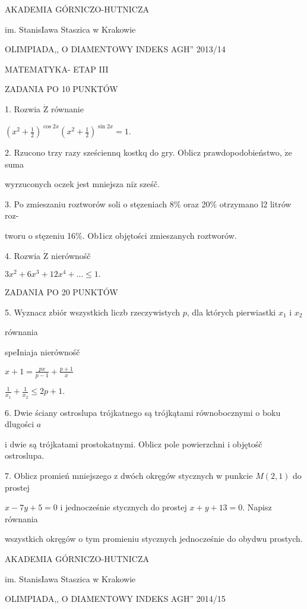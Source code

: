 \documentclass[a4paper,12pt]{article}
\begin{document}
AKADEMIA GÓRNICZO-HUTNICZA

im. StanisIawa Staszica w Krakowie

OLIMPIADA,, O DIAMENTOWY INDEKS AGH'' 2013/14

MATEMATYKA- ETAP III

ZADANIA PO 10 PUNKTÓW

1. Rozwia $\dot{\mathrm{Z}}$ równanie

$(x^{2}+\displaystyle \frac{1}{2})^{\cos 2x}(x^{2}+\frac{1}{2})^{\sin 2x}=1.$

2. Rzucono trzy razy sześciennq kostkq do gry. Oblicz prawdopodobieństwo, $\dot{\mathrm{z}}\mathrm{e}$ suma

wyrzuconych oczek jest mniejsza $\mathrm{n}\mathrm{i}\dot{\mathrm{z}}$ sześč.

3. Po zmieszaniu roztworów soli o stęzeniach 8\% oraz 20\% otrzymano l2 litrów roz-

tworu o stęzeniu 16\%. Ob1icz objętości zmieszanych roztworów.

4. Rozwia $\dot{\mathrm{Z}}$ nierównośč

$3x^{2}+6x^{3}+12x^{4}+\ldots\leq 1.$

ZADANIA PO 20 PUNKTÓW

5. Wyznacz zbiór wszystkich liczb rzeczywistych $p$, dla których pierwiastki $x_{1}$ i $x_{2}$

równania

speIniaja nierównośč

$x+1=\displaystyle \frac{px}{p-1}+\frac{p+1}{x}$

$\displaystyle \frac{1}{x_{1}}+\frac{1}{x_{2}}\leq 2p+1.$

6. Dwie ściany ostroslupa trójkatnego są trójkątami równobocznymi o boku dlugości $a$

i dwie są trójkatami prostokatnymi. Oblicz pole powierzchni i objętośč ostroslupa.

7. Oblicz promień mniejszego z dwóch okręgów stycznych w punkcie $M(2,1)$ do prostej

$x-7y+5=0$ i jednocześnie stycznych do prostej $x+y+13=0$. Napisz równania

wszystkich okręgów o tym promieniu stycznych jednocześnie do obydwu prostych.






AKADEMIA GÓRNICZO-HUTNICZA

im. StanisIawa Staszica w Krakowie

OLIMPIADA,, O DIAMENTOWY INDEKS AGH'' 2014/15
\end{document}
